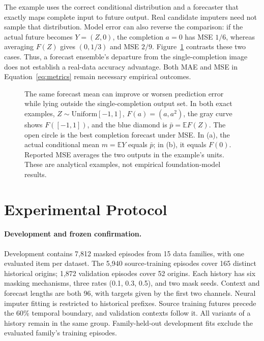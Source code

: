 \documentclass{article}
\begin{document}
The example uses the correct conditional distribution and a forecaster that exactly maps complete input to future output. Real candidate imputers need not sample that distribution. Model error can also reverse the comparison: if the actual future becomes $Y=(Z,0)$, the completion $a=0$ has MSE $1/6$, whereas averaging $F(Z)$ gives $(0,1/3)$ and MSE $2/9$. Figure~\ref{fig:vector-geometry} contrasts these two cases. Thus, a forecast ensemble's departure from the single-completion image does not establish a real-data accuracy advantage. Both MAE and MSE in Equation~\ref{eq:metrics} remain necessary empirical outcomes.

\begin{figure}[t]
\centering

\caption{The same forecast mean can improve or worsen prediction error while lying outside the single-completion output set. In both exact examples, $Z\sim\mathrm{Uniform}[-1,1]$, $F(a)=(a,a^2)$, the gray curve shows $F([-1,1])$, and the blue diamond is $\bar p=\mathbb E F(Z)$. The open circle is the best completion forecast under MSE. In (a), the actual conditional mean $m=\mathbb E Y$ equals $\bar p$; in (b), it equals $F(0)$. Reported MSE averages the two outputs in the example's units. These are analytical examples, not empirical foundation-model results.}
\label{fig:vector-geometry}
\end{figure}

\section{Experimental Protocol}

\paragraph{Development and frozen confirmation.}
Development contains 7,812 masked episodes from 15 data families, with one evaluated item per dataset. The 5,940 source-training episodes cover 165 distinct historical origins; 1,872 validation episodes cover 52 origins. Each history has six masking mechanisms, three rates (0.1, 0.3, 0.5), and two mask seeds. Context and forecast lengths are both 96, with targets given by the first two channels. Neural imputer fitting is restricted to historical prefixes. Source training futures precede the 60\% temporal boundary, and validation contexts follow it. All variants of a history remain in the same group. Family-held-out development fits exclude the evaluated family's training episodes.
\end{document}
